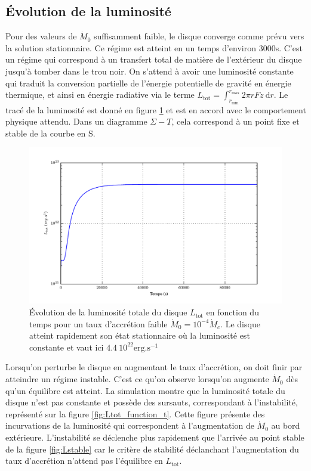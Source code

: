 \subsection{Évolution de la luminosité}

Pour des valeurs de $\dot{M}_0$ suffisamment faible, le disque converge comme prévu vers la solution stationnaire. Ce régime est atteint en un temps d'environ 3000s. C'est un régime qui correspond à un transfert total de matière de l'extérieur du disque jusqu'à tomber dans le trou noir. On s'attend à avoir une luminosité constante qui traduit la conversion partielle de l'énergie potentielle de gravité en énergie thermique, et ainsi en énergie radiative via le terme $L_\mathrm{tot} = \int_{r_\mathrm{min}}^{r_\mathrm{max}} 2\pi r Fz\ \mathrm{d}r$. Le tracé de la luminosité est donné en figure \ref{eq:Lstable} et est en accord avec le comportement physique attendu. Dans un diagramme $\Sigma-T$, cela correspond à un point fixe et stable de la courbe en S.

\begin{figure}
  \includegraphics{figures/Ltot_fonction_t_stable.pdf}
  \caption{Évolution de la luminosité totale du disque $L_\mathrm{tot}$ en fonction du temps pour un taux d'accrétion faible $\dot{M}_0 = 10^{-4}\dot{M}_c$. Le disque atteint rapidement son état stationnaire où la luminosité est constante et vaut ici $4.4\ 10^{22}\mathrm{erg.s^{-1}}$}
  \label{eq:Lstable}
\end{figure}

Lorsqu'on perturbe le disque en augmentant le taux d'accrétion, on doit finir par atteindre un régime instable. C'est ce qu'on observe lorsqu'on augmente $\dot{M}_0$ dès qu'un équilibre est atteint. La simulation montre que la luminosité totale du disque n'est pas constante et possède des sursauts, correspondant à l'instabilité, représenté sur la figure \ref{fig:Ltot_function_t}. Cette figure présente des incurvations de la luminosité qui correspondent à l'augmentation de $\dot{M}_0$ au bord extérieure. L'instabilité se déclenche plus rapidement que l'arrivée au point stable de la figure \ref{fig:Lstable} car le critère de stabilité déclanchant l'augmentation du taux d'accrétion n'attend pas l'équilibre en $L_\mathrm{tot}$.

